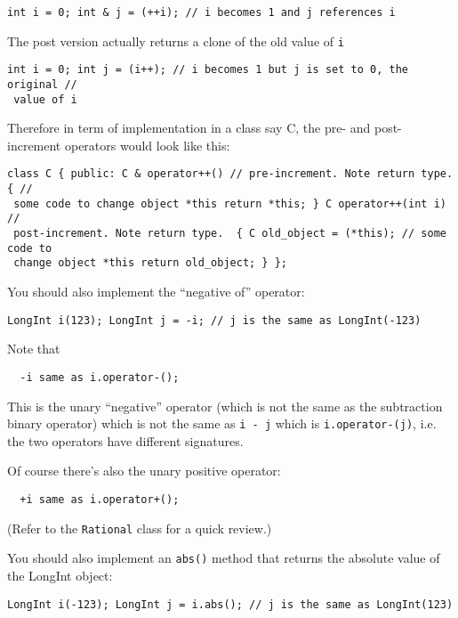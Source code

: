 \begin{Verbatim}[fontsize=\footnotesize,frame=single]
int i = 0; int & j = (++i); // i becomes 1 and j references i
\end{Verbatim}

The post version actually returns a clone of the old value of \verb!i!

\begin{Verbatim}[fontsize=\footnotesize,frame=single]
int i = 0; int j = (i++); // i becomes 1 but j is set to 0, the original //
 value of i
\end{Verbatim}

Therefore in term of implementation in a class say C, the pre- and
post-increment operators would look like this:

\begin{Verbatim}[fontsize=\footnotesize,frame=single]
class C { public: C & operator++() // pre-increment. Note return type.  { //
 some code to change object *this return *this; } C operator++(int i) //
 post-increment. Note return type.  { C old_object = (*this); // some code to
 change object *this return old_object; } };
\end{Verbatim}

You should also implement the “negative of” operator:

\begin{Verbatim}[fontsize=\footnotesize,frame=single]
LongInt i(123); LongInt j = -i; // j is the same as LongInt(-123)
\end{Verbatim}

Note that

\verb!  -i same as i.operator-();!

This is the unary “negative” operator (which is not the same as the subtraction
binary operator) which is not the same as \verb!i - j!  which is
\verb!i.operator-(j)!, i.e. the two operators have different signatures.

Of course there's also the unary positive operator:

\verb!  +i same as i.operator+();!

(Refer to the \verb!Rational! class for a quick review.)

You should also implement an \verb!abs()! method that returns the absolute
value of the LongInt object:

\begin{Verbatim}[fontsize=\footnotesize,frame=single]
LongInt i(-123); LongInt j = i.abs(); // j is the same as LongInt(123)
\end{Verbatim}

